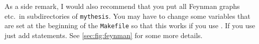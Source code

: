 As a side remark, I would also recommend that you put all Feynman
graphs etc.\ in subdirectories of \texttt{mythesis}. You may have to
change some variables that are set at the beginning of the
\texttt{Makefile} so that this works if you use . If
you use  just add  statements.
See \cref{sec:fig:feynman} for some more details.


